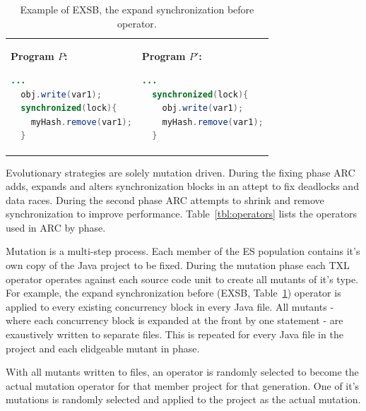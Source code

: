 \documentclass[10pt, conference, compsocconf]{IEEEtran}
\begin{document}
\begin{table}
\begin{center}
\begin{tabular}{l l}

\vspace{2mm}

\begin{minipage}{3.70cm}
\footnotesize{\textbf{ Program $P$:}}
\begin{lstlisting}[language=Java]
  ...
  obj.write(var1);
  synchronized(lock){
    myHash.remove(var1);
  }
\end{lstlisting}
\end{minipage}\hfill

&

\begin{minipage}{3.70cm}
\footnotesize{\textbf{ Program $P'$:}}
\begin{lstlisting}[language=Java]
  ...
  synchronized(lock){
    obj.write(var1);
    myHash.remove(var1);
  }
\end{lstlisting}
\end{minipage}

\end{tabular}
\caption{Example of EXSB, the expand synchronization before operator.}
\label{tbl:EXSBExample}
\end{center}
\end{table}

Evolutionary strategies are solely mutation driven. During the fixing phase ARC adds, expands and alters synchronization blocks in an attept to fix deadlocks and data races. During the second phase ARC attempts to shrink and remove synchronization to improve performance. Table~\ref{tbl:operators} lists the operators used in ARC by phase. 

Mutation is a multi-step process. Each member of the ES population contains it's
own copy of the Java project to be fixed.  During the mutation phase each TXL operator operates against each source code unit to create all mutants of it's type. For example, the expand synchronization before (EXSB, Table~\ref{tbl:EXSBExample}) operator is applied to every existing concurrency block in every Java file. All mutants - where each concurrency block is expanded at the front by one statement - are exaustively written to separate files. This is repeated for every Java file in the project and each elidgeable mutant in phase.

With all mutants written to files, an operator is randomly selected to become the actual mutation operator for that member project for that generation.  One of it's mutations is randomly selected and applied to the project as the actual mutation.
\end{document}
